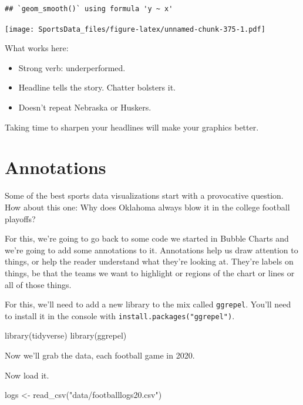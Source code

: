 \documentclass[
]{book}
\newenvironment{Shaded}{\begin{snugshade}}{\end{snugshade}}
\newcommand{\FunctionTok}[1]{\textcolor[rgb]{0.00,0.00,0.00}{#1}}
\newcommand{\NormalTok}[1]{#1}
\newcommand{\OtherTok}[1]{\textcolor[rgb]{0.56,0.35,0.01}{#1}}
\newcommand{\StringTok}[1]{\textcolor[rgb]{0.31,0.60,0.02}{#1}}
\providecommand{\tightlist}{%
  \setlength{\itemsep}{0pt}\setlength{\parskip}{0pt}}
\begin{document}
\begin{verbatim}
## `geom_smooth()` using formula 'y ~ x'
\end{verbatim}

\texttt{[image: SportsData\_files/figure-latex/unnamed-chunk-375-1.pdf]}

What works here:

\begin{itemize}
\tightlist
\item
  Strong verb: underperformed.
\item
  Headline tells the story. Chatter bolsters it.
\item
  Doesn't repeat Nebraska or Huskers.
\end{itemize}

Taking time to sharpen your headlines will make your graphics better.

\hypertarget{annotations}{%
\chapter{Annotations}\label{annotations}}

Some of the best sports data visualizations start with a provocative question. How about this one: Why does Oklahoma always blow it in the college football playoffs?

For this, we're going to go back to some code we started in Bubble Charts and we're going to add some annotations to it. Annotations help us draw attention to things, or help the reader understand what they're looking at. They're labels on things, be that the teams we want to highlight or regions of the chart or lines or all of those things.

For this, we'll need to add a new library to the mix called \texttt{ggrepel}. You'll need to install it in the console with \texttt{install.packages("ggrepel")}.

\begin{Shaded}
\begin{Highlighting}[]
\FunctionTok{library}\NormalTok{(tidyverse)}
\FunctionTok{library}\NormalTok{(ggrepel)}
\end{Highlighting}
\end{Shaded}

Now we'll grab the data, each football game in 2020.

Now load it.

\begin{Shaded}
\begin{Highlighting}[]
\NormalTok{logs }\OtherTok{\textless{}{-}} \FunctionTok{read\_csv}\NormalTok{(}\StringTok{"data/footballlogs20.csv"}\NormalTok{)}
\end{Highlighting}
\end{Shaded}
\end{document}
